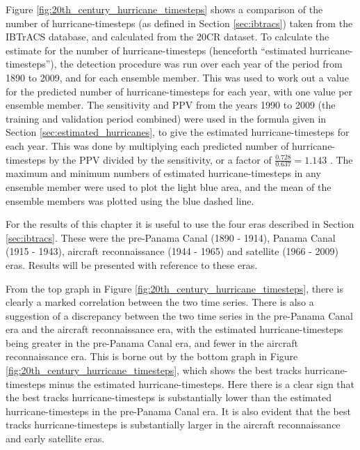 \documentclass[pdftex,12pt,a4paper]{report}
\begin{document}
Figure \ref{fig:20th_century_hurricane_timesteps} shows a comparison of the number of
hurricane-timesteps (as defined in Section \ref{sec:ibtracs}) taken from the IBTrACS database, and
calculated from the 20CR dataset. To calculate the estimate for the number of hurricane-timesteps
(henceforth ``estimated hurricane-timesteps''), the detection procedure was run over each year of
the period from 1890 to 2009, and for each ensemble member. This was used to work out a value for
the predicted number of hurricane-timesteps for each year, with one value per ensemble member. The
sensitivity and PPV from the years 1990 to 2009 (the training and validation period combined) were
used in the formula given in Section \ref{sec:estimated_hurricanes}, to give the estimated
hurricane-timesteps for each year. This was done by multiplying each predicted number of
hurricane-timesteps by the PPV divided by the sensitivity, or a factor of $\frac{0.728}{0.637} =
1.143$ . The maximum and minimum numbers of estimated hurricane-timesteps in any ensemble member
were used to plot the light blue area, and the mean of the ensemble members was plotted using the
blue dashed line.

For the results of this chapter it is useful to use the four eras described in Section
\ref{sec:ibtracs}. These were the pre-Panama Canal (1890 - 1914), Panama Canal (1915 - 1943),
aircraft reconnaissance (1944 - 1965) and satellite (1966 - 2009) eras. Results will be presented
with reference to these eras.

From the top graph in Figure \ref{fig:20th_century_hurricane_timesteps}, there is clearly a marked
correlation between the two time series. There is also a suggestion of a discrepancy between the two
time series in the pre-Panama Canal era and the aircraft reconnaissance era, with the estimated
hurricane-timesteps being greater in the pre-Panama Canal era, and fewer in the
aircraft reconnaissance era. This is borne out by the bottom graph in Figure 
\ref{fig:20th_century_hurricane_timesteps}, which shows the best tracks hurricane-timesteps minus the
estimated hurricane-timesteps. Here there is a clear sign that the best tracks hurricane-timesteps
is substantially lower than the estimated hurricane-timesteps in the pre-Panama Canal era. It is
also evident that the best tracks hurricane-timesteps is substantially larger in the aircraft
reconnaissance and early satellite eras.
\end{document}
